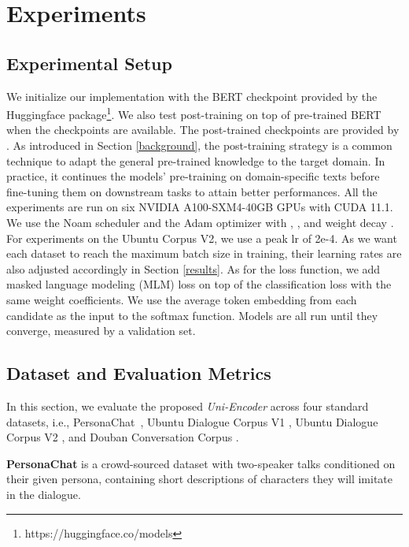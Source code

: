 \section{Experiments}

\subsection{Experimental Setup} \label{setup}

We initialize our implementation with the BERT \citep{devlin2018bert} checkpoint provided by the Huggingface package\footnote{https://huggingface.co/models}.  We also test post-training \citep{whang2021response, han2021fine} on top of pre-trained BERT when the checkpoints are available. The post-trained checkpoints are provided by \citet{han2021fine}. As introduced in Section \ref{background}, the post-training strategy is a common technique to adapt the general pre-trained knowledge to the target domain. In practice, it continues the models' pre-training on domain-specific texts before fine-tuning them on downstream tasks to attain better performances. All the experiments are run on six NVIDIA A100-SXM4-40GB GPUs with CUDA 11.1. We use the Noam scheduler and the Adam optimizer with , , and weight decay . For experiments on the Ubuntu Corpus V2, we use a peak lr of 2e-4. As we want each dataset to reach the maximum batch size in training, their learning rates are also adjusted accordingly in Section \ref{results}. As for the loss function, we add masked language modeling (MLM) loss on top of the classification loss with the same weight coefficients. We use the average token embedding from each candidate as the input to the softmax function. Models are all run until they converge, measured by a validation set. 


\subsection{Dataset and Evaluation Metrics} \label{dataset}

In this section, we evaluate the proposed \textit{Uni-Encoder} across four standard datasets, i.e., PersonaChat~\citep{zhang2018personalizing},  Ubuntu Dialogue Corpus V1 \citep{lowe2015ubuntu}, Ubuntu Dialogue Corpus V2 \citep{lowe2017training}, and Douban Conversation Corpus \citep{wu2016sequential}.

\noindent\textbf{PersonaChat} \citep{zhang2018personalizing} is a crowd-sourced dataset with two-speaker talks conditioned on their given persona, containing short descriptions of characters they will imitate in the dialogue.

